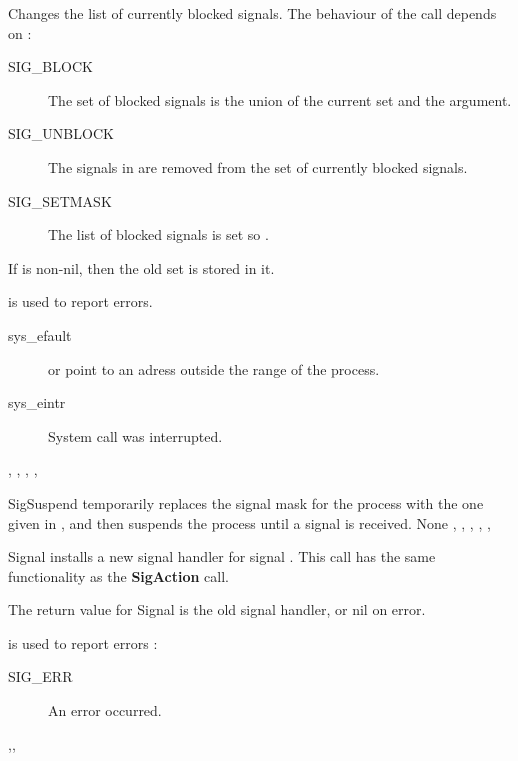{
Changes the list of currently blocked signals. The behaviour of the call
depends on  :
\begin{description}
\item[SIG\_BLOCK] The set of blocked signals is the union of the current set
and the  argument.
\item[SIG\_UNBLOCK] The signals in  are removed from the set of
currently blocked signals.
\item[SIG\_SETMASK] The list of blocked signals is set so .
\end{description}
If  is non-nil, then the old set is stored in it.
}
{ is used to report errors.
\begin{description}
\item[sys\_efault]  or  point to an adress outside
the range of the process.
\item[sys\_eintr] System call was interrupted.
\end{description}
}
{, , , ,
 }

{SigSuspend temporarily replaces the signal mask for the process with the one
given in , and then suspends the process until a signal is received.
}
{None}
{, , , ,
,  }

{
Signal installs a new signal handler for signal . This call has
the same functionality as the \textbf{SigAction} call.

The return value for Signal is the old signal handler, or nil on error.
}
{ is used to report errors :
\begin{description}
\item[SIG\_ERR] An error occurred.
\end{description}
}
{,,  }

